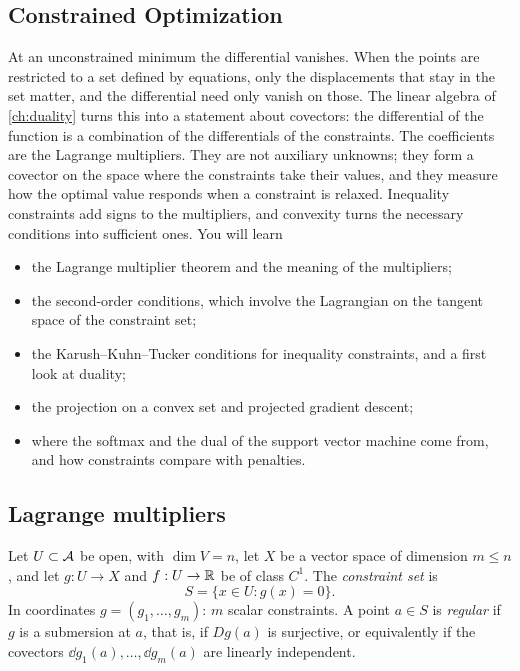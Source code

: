\begin{notechapter}
\chapter{Constrained Optimization}
\label{ch:constrained-optimization}

\begin{chapterintro}
At an unconstrained minimum the differential vanishes. When the points
are restricted to a set defined by equations, only the displacements that
stay in the set matter, and the differential need only vanish on those.
The linear algebra of \cref{ch:duality} turns this into a statement about
covectors: the differential of the function is a combination of the
differentials of the constraints. The coefficients are the Lagrange
multipliers. They are not auxiliary unknowns; they form a covector on the
space where the constraints take their values, and they measure how the
optimal value responds when a constraint is relaxed. Inequality
constraints add signs to the multipliers, and convexity turns the
necessary conditions into sufficient ones. You will learn
\begin{itemize}[nosep]
  \item the Lagrange multiplier theorem and the meaning of the
        multipliers;
  \item the second-order conditions, which involve the Lagrangian on the
        tangent space of the constraint set;
  \item the Karush--Kuhn--Tucker conditions for inequality constraints,
        and a first look at duality;
  \item the projection on a convex set and projected gradient descent;
  \item where the softmax and the dual of the support vector machine come
        from, and how constraints compare with penalties.
\end{itemize}
\end{chapterintro}

\section{Lagrange multipliers}\label{constrained-optimization:sec:lagrange}

Let $U\subset\mathcal{A}$ be open, with $\dim V = n$, let $X$ be a vector space
of dimension $m\leq n$, and let $g:U\to X$ and $f:U\to\mathbb{R}$ be of class
$C^1$. The \emph{constraint set} is
\[
  S = \{x\in U : g(x) = 0\} .
\]
In coordinates $g = (g_1,\dots,g_m)$: $m$ scalar constraints. A point
$a\in S$ is \emph{regular} if $g$ is a submersion at $a$, that is, if
$Dg(a)$ is surjective, or equivalently if the covectors
$\dd g_1(a),\dots,\dd g_m(a)$ are linearly independent.


\end{notechapter}

